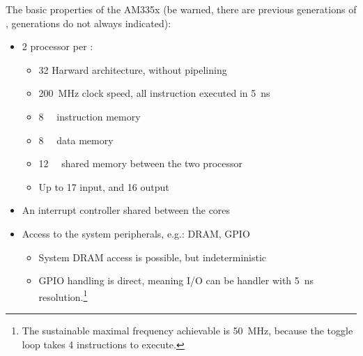 The basic properties of the AM335x \pruss (be warned, there are previous generations of \pruss, generations do not always indicated):
\begin{itemize}
	\item 2 \pru processor per \pruss:
	\begin{itemize}
		\item \SI{32}{\bit} Harward architecture, without pipelining
		\item \SI{200}{\mega\hertz} clock speed, all instruction executed in \SI{5}{\nano\second}
		\item \SI{8}{\kilo\byte} instruction memory
		\item \SI{8}{\kilo\byte} data memory
		\item \SI{12}{\kilo\byte} shared memory between the two processor
		\item Up to 17 input, and 16 output
	\end{itemize}
	\item An interrupt controller shared between the \pru cores
	\item Access to the system peripherals, e.g.: DRAM, GPIO
	\begin{itemize}
		\item System DRAM access is possible, but indeterministic
		\item GPIO handling is direct, meaning I/O can be handler with \SI{5}{\nano\second} resolution.\footnote{The sustainable maximal frequency achievable is \SI{50}{\mega\hertz}, because the toggle loop takes 4 instructions to execute.}
	\end{itemize}
\end{itemize}

